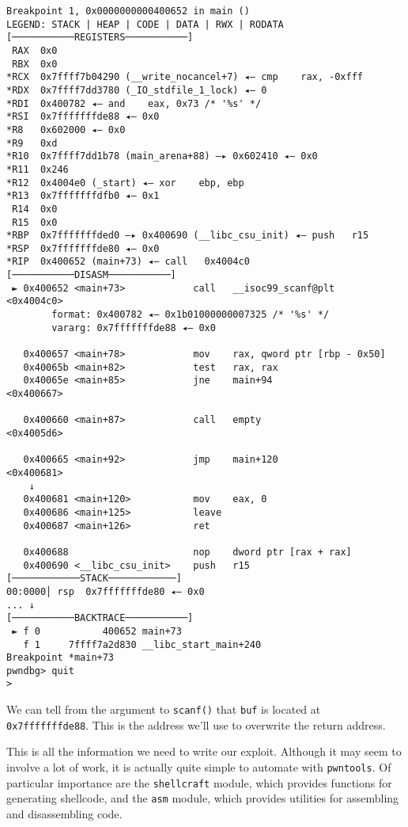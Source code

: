 \documentclass{article}
\begin{document}
\begin{lstlisting}
Breakpoint 1, 0x0000000000400652 in main ()
LEGEND: STACK | HEAP | CODE | DATA | RWX | RODATA
[───────────REGISTERS───────────]
 RAX  0x0
 RBX  0x0
*RCX  0x7ffff7b04290 (__write_nocancel+7) ◂— cmp    rax, -0xfff
*RDX  0x7ffff7dd3780 (_IO_stdfile_1_lock) ◂— 0
*RDI  0x400782 ◂— and    eax, 0x73 /* '%s' */
*RSI  0x7fffffffde88 ◂— 0x0
*R8   0x602000 ◂— 0x0
*R9   0xd
*R10  0x7ffff7dd1b78 (main_arena+88) —▸ 0x602410 ◂— 0x0
*R11  0x246
*R12  0x4004e0 (_start) ◂— xor    ebp, ebp
*R13  0x7fffffffdfb0 ◂— 0x1
 R14  0x0
 R15  0x0
*RBP  0x7fffffffded0 —▸ 0x400690 (__libc_csu_init) ◂— push   r15
*RSP  0x7fffffffde80 ◂— 0x0
*RIP  0x400652 (main+73) ◂— call   0x4004c0
[───────────DISASM───────────]
 ► 0x400652 <main+73>            call   __isoc99_scanf@plt            <0x4004c0>
        format: 0x400782 ◂— 0x1b01000000007325 /* '%s' */
        vararg: 0x7fffffffde88 ◂— 0x0
 
   0x400657 <main+78>            mov    rax, qword ptr [rbp - 0x50]
   0x40065b <main+82>            test   rax, rax
   0x40065e <main+85>            jne    main+94                       <0x400667>
 
   0x400660 <main+87>            call   empty                         <0x4005d6>
 
   0x400665 <main+92>            jmp    main+120                      <0x400681>
    ↓
   0x400681 <main+120>           mov    eax, 0
   0x400686 <main+125>           leave  
   0x400687 <main+126>           ret    
 
   0x400688                      nop    dword ptr [rax + rax]
   0x400690 <__libc_csu_init>    push   r15
[────────────STACK────────────]
00:0000│ rsp  0x7fffffffde80 ◂— 0x0
... ↓
[───────────BACKTRACE───────────]
 ► f 0           400652 main+73
   f 1     7ffff7a2d830 __libc_start_main+240
Breakpoint *main+73
pwndbg> quit
> 
\end{lstlisting}

We can tell from the argument to \texttt{scanf()} that \texttt{buf} is located
at \texttt{0x7fffffffde88}. This is the address we'll use to overwrite the
return address.

This is all the information we need to write our exploit. Although it may seem
to involve a lot of work, it is actually quite simple to automate with
\texttt{pwntools}. Of particular importance are the \texttt{shellcraft} module,
which provides functions for generating shellcode, and the \texttt{asm} module,
which provides utilities for assembling and disassembling code. 
\end{document}
